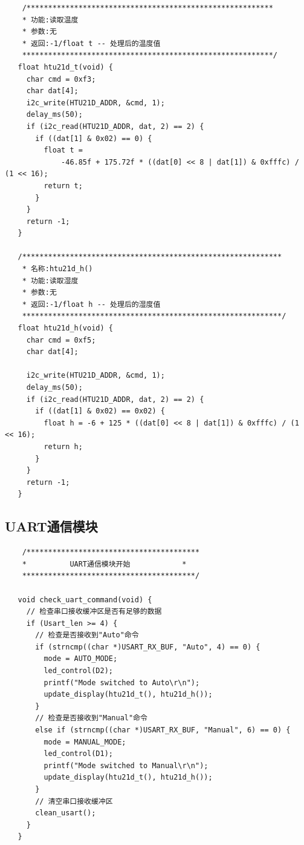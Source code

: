 \begin{lstlisting}
    /*********************************************************
    * 功能:读取温度
    * 参数:无
    * 返回:-1/float t -- 处理后的温度值
    **********************************************************/
   float htu21d_t(void) {
     char cmd = 0xf3;
     char dat[4];
     i2c_write(HTU21D_ADDR, &cmd, 1);
     delay_ms(50);
     if (i2c_read(HTU21D_ADDR, dat, 2) == 2) {
       if ((dat[1] & 0x02) == 0) {
         float t =
             -46.85f + 175.72f * ((dat[0] << 8 | dat[1]) & 0xfffc) / (1 << 16);
         return t;
       }
     }
     return -1;
   }

   /************************************************************
    * 名称:htu21d_h()
    * 功能:读取湿度
    * 参数:无
    * 返回:-1/float h -- 处理后的湿度值
    ************************************************************/
   float htu21d_h(void) {
     char cmd = 0xf5;
     char dat[4];

     i2c_write(HTU21D_ADDR, &cmd, 1);
     delay_ms(50);
     if (i2c_read(HTU21D_ADDR, dat, 2) == 2) {
       if ((dat[1] & 0x02) == 0x02) {
         float h = -6 + 125 * ((dat[0] << 8 | dat[1]) & 0xfffc) / (1 << 16);
         return h;
       }
     }
     return -1;
   }
\end{lstlisting}

\subsection{UART通信模块}

\begin{lstlisting}
    /****************************************
    *          UART通信模块开始            *
    ****************************************/

   void check_uart_command(void) {
     // 检查串口接收缓冲区是否有足够的数据
     if (Usart_len >= 4) {
       // 检查是否接收到"Auto"命令
       if (strncmp((char *)USART_RX_BUF, "Auto", 4) == 0) {
         mode = AUTO_MODE;
         led_control(D2);
         printf("Mode switched to Auto\r\n");
         update_display(htu21d_t(), htu21d_h());
       }
       // 检查是否接收到"Manual"命令
       else if (strncmp((char *)USART_RX_BUF, "Manual", 6) == 0) {
         mode = MANUAL_MODE;
         led_control(D1);
         printf("Mode switched to Manual\r\n");
         update_display(htu21d_t(), htu21d_h());
       }
       // 清空串口接收缓冲区
       clean_usart();
     }
   }
\end{lstlisting}

